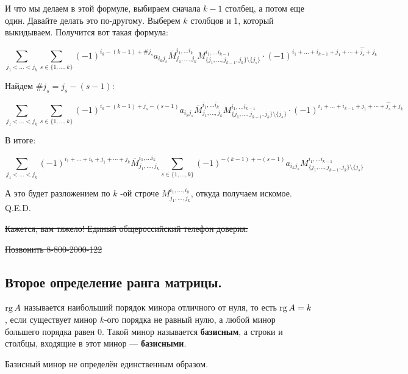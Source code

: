 \begin{itemize}
          И что мы делаем в этой формуле, выбираем сначала $k-1$ столбец, а потом еще один. Давайте делать это по-другому. Выберем $k$ столбцов и 1, который выкидываем. Получится вот такая формула:


          \small\[\sum\limits_{j_1<\ldots<j_k} \sum\limits_{s \in \{1,\ldots,k\}} (-1)^{i_k -(k-1) +\# j_s} a_{i_kj_s}\overline{M}_{j_1,\ldots,j_{k}}^{i_1,\ldots i_k} M_{\{j_1,\ldots,j_{k-1}, j_k\}\setminus\{j_s\} }^{i_1,\ldots i_{k-1}} \cdot (-1)^{i_1+ \ldots+i_{k-1} + j_1 + \cdots + \widehat{j_{s}}+j_{k}}\]\normalsize

          Найдем $\#j_s = j_s-(s-1)$:

          \small\[\sum\limits_{j_1<\ldots<j_k} \sum\limits_{s \in \{1,\ldots,k\}} (-1)^{i_k -(k-1) +j_s-(s-1)} a_{i_kj_s}\overline{M}_{j_1,\ldots,j_{k}}^{i_1,\ldots i_k} M_{\{j_1,\ldots,j_{k-1}, j_k\}\setminus\{j_s\}}^{i_1,\ldots i_{k-1}} \cdot (-1)^{i_1+ \ldots+i_{k-1} + j_1 + \cdots + \widehat{j_{s}}+j_{k}}\]\normalsize

          В итоге:

          \small\[\sum\limits_{j_1<\ldots<j_k} (-1)^{i_1+ \ldots+i_{k} + j_1 + \cdots + j_{k}}\overline{M}_{j_1,\ldots,j_{k}}^{i_1,\ldots i_k}\sum\limits_{s \in \{1,\ldots,k\}} (-1)^{ -(k-1) +-(s-1)} a_{i_kj_s} M_{\{j_1,\ldots,j_{k-1}, j_k\}\setminus\{j_s\}}^{i_1,\ldots i_{k-1}}\]\normalsize

          А это будет разложением по $k$ -ой строче $M_{j_1, \dots, j_k}^{i_1, \dots, i_k}$, откуда получаем искомое. Q.E.D.


          \sout{Кажется, вам тяжело! Единый общероссийский телефон доверия:}

          \sout{Позвонить 8-800-2000-122}
\end{itemize}



\subsection{Второе определение ранга матрицы.}



\(\operatorname{rg} A\) называется наибольший порядок минора отличного от нуля, то есть \(\operatorname{rg} A = k\), если существует минор $k$-ого порядка не равный нулю, а любой минор большего порядка равен 0. Такой минор называется \textbf{базисным}, а строки и столбцы, входящие в этот минор --- \textbf{базисными}.

Базисный минор не определён единственным образом.

